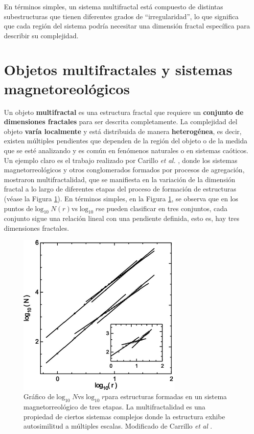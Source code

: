 En t\'{e}rminos simples, un sistema multifractal est\'{a} compuesto de distintas subestructuras que tienen diferentes grados de ``irregularidad'', lo que significa que cada regi\'{o}n del sistema podr\'{i}a necesitar una dimensi\'{o}n fractal espec\'{i}fica para describir su complejidad.

\section*{Objetos multifractales y sistemas magnetoreol\'{o}gicos}

Un objeto \textbf{multifractal} es una estructura fractal que requiere un \textbf{conjunto de dimensiones fractales} para ser descrita completamente. La complejidad del objeto \textbf{var\'{i}a localmente} y est\'{a} distribuida de manera \textbf{heterog\'{e}nea}, es decir, existen m\'{u}ltiples pendientes que dependen de la regi\'{o}n del objeto o de la medida que se est\'{e} analizando y es com\'{u}n en fen\'{o}menos naturales o en sistemas ca\'{o}ticos. Un ejemplo claro es el trabajo realizado por Carillo \textit{et al.} \cite{Carrillo2003}, donde los sistemas 
magnetorreol\'{o}gicos y otros conglomerados formados por procesos de agregaci\'{o}n, mostraron multifractalidad, que se manifiesta en la variaci\'{o}n de la dimensi\'{o}n fractal a lo largo de diferentes etapas del proceso de formaci\'{o}n 
de estructuras (v\'{e}ase la Figura \ref{fig:Carrillo-Fractal}). En t\'{e}rminos simples, en la Figura \ref{fig:Carrillo-Fractal}, se observa que en los puntos de$\log_{10}N(r)$vs$\log_{10}r$se pueden clasificar en tres conjuntos, cada conjunto sigue una relaci\'{o}n lineal con una pendiente definida, esto es, hay tres dimensiones fractales.


\begin{figure}[H]
	\begin{center}
		\includegraphics[width=0.4\linewidth]{graphs/Carrillo2003}
		\caption{Gr\'{a}fico de$\log_{10}N$vs$\log_{10}r$para estructuras formadas en un sistema magnetorreol\'{o}gico de tres etapas. La multifractalidad es una propiedad de ciertos sistemas complejos donde la estructura exhibe autosimilitud a m\'{u}ltiples  escalas. Modificado de Carrillo \textit{et al} \cite{Carrillo2003}.}
		\label{fig:Carrillo-Fractal}
	\end{center}
\end{figure}

